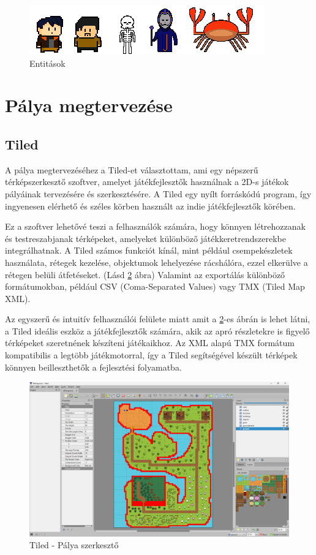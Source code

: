 \begin{figure}[H]
    \centering
    \includegraphics[width=12.0truecm]{images/entities.png}
    \caption{Entitások}
    \label{fig:Entitások}
\end{figure}


\section{Pálya megtervezése}

\subsection{Tiled}
\label{subsec:Tiled}
\indent \indent A pálya megtervezéséhez a Tiled-et \cite{Tiled} választottam, ami egy népszerű térképszerkesztő szoftver, amelyet játékfejlesztők használnak a 2D-s játékok pályáinak tervezésére és szerkesztésére.   A Tiled egy nyílt forráskódú program, így ingyenesen elérhető és széles körben használt az indie játékfejlesztők körében.

Ez a szoftver lehetővé teszi a felhasználók számára, hogy könnyen létrehozzanak és testreszabjanak térképeket, amelyeket különböző játékkeretrendszerekbe integrálhatnak. A Tiled számos funkciót kínál, mint például csempekészletek használata, rétegek kezelése, objektumok lehelyezése rácshálóra, ezzel elkerülve a rétegen belüli átfetéseket. (Lásd \ref{fig:Tiled} ábra) Valamint az exportálás különböző formátumokban, például CSV (Coma-Separated Values) vagy TMX (Tiled Map XML).

Az egyszerű és intuitív felhasználói felülete miatt amit a \ref{fig:Tiled}-es ábrán is lehet látni, a Tiled ideális eszköz a játékfejlesztők számára, akik az apró részletekre is figyelő térképeket szeretnének készíteni játékaikhoz. Az XML alapú TMX formátum kompatibilis a legtöbb játékmotorral, így a Tiled segítségével készült térképek könnyen beilleszthetők a fejlesztési folyamatba.

\begin{figure}[H]
    \centering
    \includegraphics[width=14.0truecm]{images/Tiled.png}
    \caption{Tiled - Pálya szerkesztő
    \cite{Tiled}}
    \label{fig:Tiled}
\end{figure}


